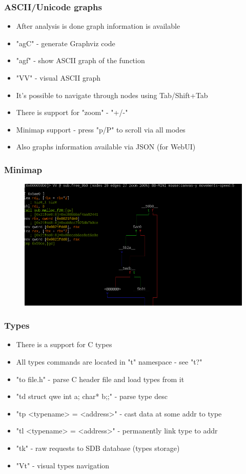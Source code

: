 \documentclass[10pt,pdf,utf8,english,compress,hyperref={unicode}]{beamer}
\begin{document}
\begin{frame}[fragile]
  \frametitle{ASCII/Unicode graphs}
  \begin{itemize}
	  \item After analysis is done graph information is available
	  \item "agC" - generate Graphviz code
	  \item "agf" - show ASCII graph of the function
	  \item "VV" - visual ASCII graph
	  \item It's possible to navigate through nodes using Tab/Shift+Tab
	  \item There is support for "zoom" - "+/-"
	  \item Minimap support - press "p/P" to scroll via all modes
	  \item Also graphs information available via JSON (for WebUI)
  \end{itemize}
\end{frame}

\begin{frame}[fragile]
	\frametitle{Minimap}
	\begin{figure}
		\includegraphics[width=\linewidth]{r2minimap.png}
	\end{figure}
\end{frame}

\begin{frame}[fragile]
  \frametitle{Types}
  \begin{itemize}
	  \item There is a support for C types
	  \item All types commands are located in "t" namespace - see "t?"
	  \item "to file.h" - parse C header file and load types from it
	  \item "td struct qwe {int a; char* b;};" - parse type desc
	  \item "tp <typename> = <address>" - cast data at some addr to type
	  \item "tl <typename> = <address>" - permanently link type to addr
	  \item "tk" - raw requests to SDB database (types storage)
	  \item "Vt" - visual types navigation
  \end{itemize}
\end{frame}
\end{document}
